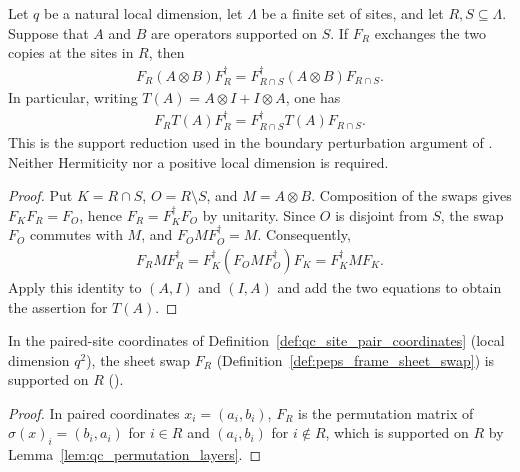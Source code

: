\begin{lemma}
    \label{thm:peps_sheet_swap_interaction_restriction}
    \leanok
    Let $q$ be a natural local dimension, let $\Lambda$ be a finite set of
    sites, and let $R,S\subseteq\Lambda$. Suppose that $A$ and $B$ are
    operators supported on $S$. If $F_R$ exchanges the two copies at the
    sites in $R$, then
    \begin{align}
        F_R(A\otimes B)F_R^\dagger
        =F_{R\cap S}^\dagger(A\otimes B)F_{R\cap S}.
    \end{align}
    In particular, writing $T(A)=A\otimes I+I\otimes A$, one has
    \begin{align}
        F_R T(A) F_R^\dagger = F_{R\cap S}^\dagger T(A) F_{R\cap S}.
        \label{eq:peps_swap_interaction_restriction}
    \end{align}
    This is the support reduction used in the boundary perturbation argument
    of \cite{OpenAI2026PolynomialPEPS}. Neither Hermiticity nor a positive
    local dimension is required.
\end{lemma}
\begin{proof}
    \leanok
    Put $K=R\cap S$, $O=R\setminus S$, and $M=A\otimes B$. Composition
    of the swaps gives $F_K F_R=F_O$, hence $F_R=F_K^\dagger F_O$ by
    unitarity. Since $O$ is disjoint from $S$, the swap $F_O$ commutes
    with $M$, and $F_O M F_O^\dagger=M$. Consequently,
    \begin{align}
        F_R M F_R^\dagger
        =F_K^\dagger(F_O M F_O^\dagger)F_K
        =F_K^\dagger M F_K.
    \end{align}
    Apply this identity to $(A,I)$ and $(I,A)$ and add the two equations
    to obtain the assertion for $T(A)$.
\end{proof}

\begin{lemma}
    \label{thm:peps_sheet_swap_paired_site_support}
    \leanok
    In the paired-site coordinates of Definition~\ref{def:qc_site_pair_coordinates}
    (local dimension $q^2$), the sheet swap $F_R$
    (Definition~\ref{def:peps_frame_sheet_swap}) is supported on $R$
    (\cite{OpenAI2026PolynomialPEPS}).
\end{lemma}
\begin{proof}\leanok
    In paired coordinates $x_i=(a_i,b_i)$, $F_R$ is the permutation matrix of
    $\sigma(x)_i=(b_i,a_i)$ for $i\in R$ and $(a_i,b_i)$ for $i\notin R$, which
    is supported on $R$ by Lemma~\ref{lem:qc_permutation_layers}.
\end{proof}


